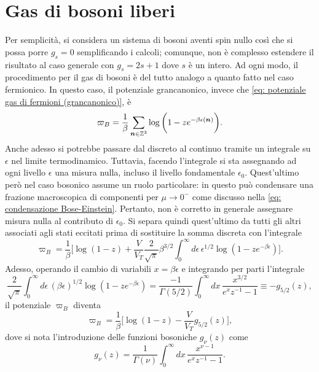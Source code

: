 \section{Gas di bosoni liberi}
Per semplicità, si considera un sistema di bosoni aventi spin nullo così che si possa porre $g_s = 0$ semplificando i calcoli; comunque, non è complesso estendere il risultato al caso generale con $g_s = 2s + 1$ dove $s$ è un intero. Ad ogni modo, il procedimento per il gas di bosoni è del tutto analogo a quanto fatto nel caso fermionico. In questo caso, il potenziale grancanonico, invece che \eqref{eq: potenziale gas di fermioni (grancanonico)}, è
\begin{equation}
    \varpi_B = \frac{1}{\beta}\sum_{\bm{n}\in\mathbb{Z}^3}\log{\bigg(1 - ze^{-\beta\epsilon(\bm{n})}\bigg)}.
\end{equation}
Anche adesso si potrebbe passare dal discreto al continuo tramite un integrale su $\epsilon$ nel limite termodinamico. Tuttavia, facendo l'integrale si sta assegnando ad ogni livello $\epsilon$ una misura nulla, incluso il livello fondamentale $\epsilon_0$. Quest'ultimo però nel caso bosonico assume un ruolo particolare: in questo può condensare una frazione macroscopica di componenti per $\mu \to 0^-$ come discusso nella \eqref{eq: condensazione Bose-Einstein}. Pertanto, non è corretto in generale assegnare misura nulla al contributo di $\epsilon_0$. Si separa quindi quest'ultimo da tutti gli altri associati agli stati eccitati prima di sostituire la somma discreta con l'integrale
\begin{equation}
    \varpi_B = \frac{1}{\beta}\bigg[\log{(1-z)} + \frac{V}{V_T}\frac{2}{\sqrt{\pi}}\beta^{3/2}\int_0^\infty d\epsilon\,\epsilon^{1/2}\log{(1-ze^{-\beta\epsilon})}\bigg].
\end{equation}
Adesso, operando il cambio di variabili $x = \beta\epsilon$ e integrando per parti l'integrale
\begin{equation}
    \frac{2}{\sqrt{\pi}}\int_0^\infty d\epsilon\,(\beta\epsilon)^{1/2}\log{(1-ze^{-\beta\epsilon})} = \frac{-1}{\Gamma(5/2)}\int_0^\infty dx\,\frac{x^{3/2}}{e^xz^{-1} - 1} \equiv -g_{5/2}(z),
\end{equation}
il potenziale $\varpi_B$ diventa
\begin{equation}
    \varpi_B = \frac{1}{\beta}\bigg[\log{(1-z)} - \frac{V}{V_T}g_{5/2}(z)\bigg],
\end{equation}
dove si nota l'introduzione delle funzioni bosoniche $g_\nu(z)$ come
\begin{equation}
    g_\nu(z) = \frac{1}{\Gamma(\nu)}\int_0^\infty dx\,\frac{x^{\nu-1}}{e^xz^{-1} - 1}.
\end{equation}
